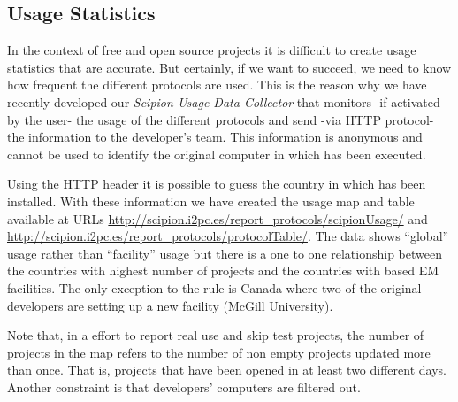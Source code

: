\subsection{Usage Statistics}
In the context of free and open source projects it is difficult to create usage statistics that are accurate. But certainly, if we want \scipion to succeed, we need to 
know how frequent the different protocols are used. This is the reason why we have recently developed our \textit{Scipion Usage Data Collector} that monitors -if activated by the user- the usage of the different protocols and send -via HTTP protocol- the information to the developer's team. This information is anonymous and cannot be used to identify the original computer in which \scipion has been executed. 

Using the HTTP header it is possible to guess the country in which \scipion has been installed. With these information we have created the usage map and table available at URLs \url{http://scipion.i2pc.es/report_protocols/scipionUsage/} and  \url{http://scipion.i2pc.es/report_protocols/protocolTable/}. The data shows ``global'' \scipion usage rather than ``facility'' usage but there 
is a one to one relationship between the  countries with highest number of \scipion projects and the countries with \scipion based EM facilities. The only exception to the rule is Canada where two of the original \scipion developers are setting up a new facility (McGill University).

Note that, in a effort to report real use and skip test projects, the number of projects in the map refers to the number of non empty \scipion projects updated more than once. That is, 
\scipion projects that have been opened in at least two different days. Another constraint is that developers' computers are filtered out.

